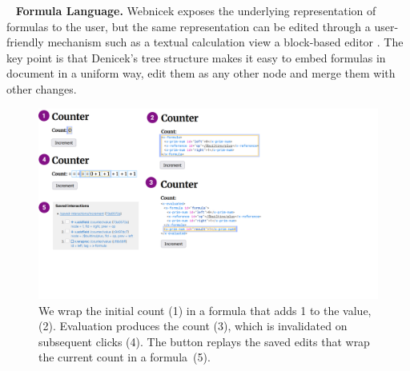 \documentclass[sigconf,anonymous,screen]{acmart}
\newcommand{\note}[1]{\textcolor{red}{#1}}
\DeclareRobustCommand{\keyideabox}[3]{\begin{tcolorbox}[breakable,
  boxsep=5pt,left=0pt,right=0pt,top=0pt,bottom=0pt,width=\dimexpr\columnwidth\relax,
  colback=gray!20,colframe=gray!20,
  enlarge bottom by=0pt,enlarge top by=0pt,
  arc=0pt,outer arc=0pt]
\lettrine[lraise=0.3]{\LARGE #1}{~}
\small \textbf{#2.} #3
\end{tcolorbox}
}
\begin{document}

\keyideabox{\faSuperscript}{Formula Language}{
Webnicek exposes the underlying representation of formulas to the user, but the same representation
can be edited through a user-friendly mechanism such as a textual calculation view \cite{sarkar-2018-calc}
a block-based editor \cite{jansen-2019-xlblocks}. The key point
is that Denicek's tree structure makes it easy to embed formulas in document in a uniform
way, edit them as any other node and merge them with other changes.}


\begin{figure}[t]
\vspace{-0.5em}
\includegraphics[width=0.95\columnwidth,clip,trim=0cm 5cm 11.5cm 0cm]{fig/counter.pdf}
\vspace{-0.5em}
\caption{We wrap the initial count (1) in a formula that adds 1 to the
value, (2). Evaluation produces the count (3), which is invalidated on subsequent clicks (4).
The button replays the saved edits that wrap the current count in a formula~(5).}
\label{fig:counter}
\vspace{-1em}
\end{figure}
\end{document}
